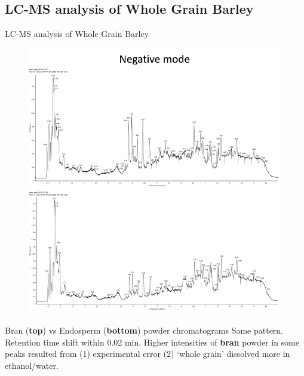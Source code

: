 \documentclass{beamer}
\begin{document}
\subsection{LC-MS analysis of Whole Grain Barley}
\begin{frame}{LC-MS analysis of Whole Grain Barley}
\begin{figure}[h]
    \centering
    \includegraphics[scale=0.25]{images/chromatogram_barley_neg.png}
\end{figure}
\small{
\begin{block}{Bran (\textbf{top}) vs Endosperm (\textbf{bottom}) powder chromatograms} Same pattern. Retention time shift within 0.02 min. Higher intensities of \textbf{bran} powder in some peaks resulted from (1) experimental error (2) `whole grain' dissolved more in ethanol/water.
\end{block}}
\end{frame}



\end{document}
